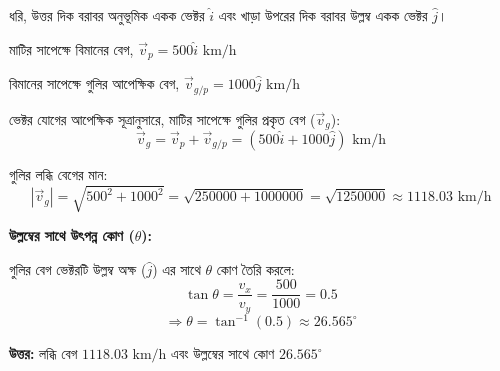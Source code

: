 \documentclass[11pt,a4paper]{article}
\begin{document}
\begin{solbox}
\begin{center}
\end{center}

ধরি, উত্তর দিক বরাবর অনুভূমিক একক ভেক্টর $\hat{i}$ এবং খাড়া উপরের দিক বরাবর উল্লম্ব একক ভেক্টর $\hat{j}$।

মাটির সাপেক্ষে বিমানের বেগ, $\vec{v}_p = 500\hat{i}\text{ km/h}$

বিমানের সাপেক্ষে গুলির আপেক্ষিক বেগ, $\vec{v}_{g/p} = 1000\hat{j}\text{ km/h}$

ভেক্টর যোগের আপেক্ষিক সূত্রানুসারে, মাটির সাপেক্ষে গুলির প্রকৃত বেগ ($\vec{v}_g$):
$$\vec{v}_g = \vec{v}_p + \vec{v}_{g/p} = (500\hat{i} + 1000\hat{j})\text{ km/h}$$

গুলির লব্ধি বেগের মান:
$$|\vec{v}_g| = \sqrt{500^2 + 1000^2} = \sqrt{250000 + 1000000} = \sqrt{1250000} \approx 1118.03\text{ km/h}$$

\textbf{উল্লম্বের সাথে উৎপন্ন কোণ ($\theta$):}

গুলির বেগ ভেক্টরটি উল্লম্ব অক্ষ ($\hat{j}$) এর সাথে $\theta$ কোণ তৈরি করলে:
$$\tan\theta = \frac{v_x}{v_y} = \frac{500}{1000} = 0.5$$
$$\Rightarrow \theta = \tan^{-1}(0.5) \approx 26.565^\circ$$

\textbf{উত্তর:} লব্ধি বেগ $1118.03\text{ km/h}$ এবং উল্লম্বের সাথে কোণ $26.565^\circ$
\end{solbox}

\vspace{0.4cm}
\end{document}
